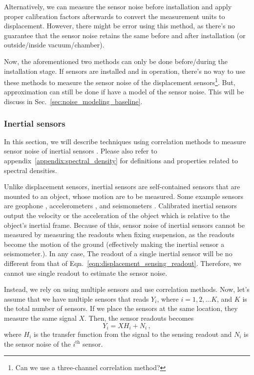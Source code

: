 Alternatively, we can measure the sensor noise before installation and apply proper calibration factors afterwards to convert the measurement units to displacement.
However, there might be error using this method, as there's no guarantee that the sensor noise retains the same before and after installation (or outside/inside vacuum/chamber).

Now, the aforementioned two methods can only be done before/during the installation stage.
If sensors are installed and in operation, there's no way to use these methods to measure the sensor noise of the displacement sensors\footnote{Can we use a three-channel correlation method?}.
But, approximation can still be done if have a model of the sensor noise.
This will be discuss in Sec.~\ref{sec:noise_modeling_baseline}.

\subsubsection{Inertial sensors \label{sec:inertial_sensors_baseline}}
In this section, we will describe techniques using correlation methods to measure sensor noise of inertial sensors \cite{technique_for_measurement_of_the_noise, Sleeman2006ThreeChannelCA}. Please also refer to appendix~\ref{appendix:spectral_density} for definitions and properties related to spectral densities.

Unlike displacement sensors, inertial sensors are self-contained sensors that are mounted to an object, whose motion are to be measured.
Some example sensors are geophone \cite{Sekiguchi:2016bmv}, accelerometers \cite{status_of_acc_development_2}, and seismometers \cite{trillium_compact_120-sv1}.
Calibrated inertial sensors output the velocity or the acceleration of the object which is relative to the object's inertial frame.
Because of this, sensor noise of inertial sensors cannot be measured by measuring the readouts when fixing suspension, as the readouts become the motion of the ground (effectively making the inertial sensor a seismometer.).
In any case, The readout of a single inertial sensor will be no different from that of Eqn.~\eqref{eqn:displacement_sensing_readout}.
Therefore, we cannot use single readout to estimate the sensor noise.

Instead, we rely on using multiple sensors and use correlation methods.
Now, let's assume that we have multiple sensors that reads $Y_i$, where $i=1,2,...K$, and $K$ is the total number of sensors.
If we place the sensors at the same location, they measure the same signal $X$.
Then, the sensor readouts becomes
\begin{equation}
	Y_i = XH_i + N_i\,,
	\label{eqn:inertial_sensing_readout}
\end{equation}
where $H_i$ is the transfer function from the signal to the sensing readout and $N_i$ is the sensor noise of the $i^\mathrm{th}$ sensor.

